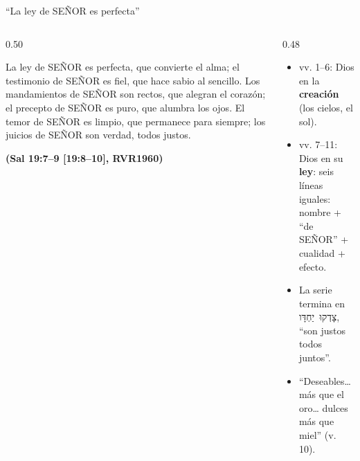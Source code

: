 \documentclass[hyperref={bookmarks=false},aspectratio=169]{beamer}
\newcommand{\heb}[1]{\mbox{\foreignlanguage{hebrew}{#1}}}
\newcommand{\SENOR}{S{\fontsize{0.78em}{1em}\selectfont EÑOR}}
\newcommand{\fuente}[1]{\par\hfill{\upshape\bfseries\footnotesize\textcolor{azul}{#1}}}
\newcommand{\destacar}[1]{\textbf{\textcolor{azul}{#1}}}
\begin{document}
\begin{frame}{``La ley de \SENOR{} es perfecta''}
\begin{columns}[c,onlytextwidth]
\begin{column}{0.50\textwidth}
\begin{cita}La ley de \SENOR{} es perfecta, que convierte el alma; el testimonio de \SENOR{} es fiel, que hace sabio al sencillo. Los mandamientos de \SENOR{} son rectos, que alegran el corazón; el precepto de \SENOR{} es puro, que alumbra los ojos. El temor de \SENOR{} es limpio, que permanece para siempre; los juicios de \SENOR{} son verdad, todos justos.\fuente{(Sal 19:7--9 [19:8--10], RVR1960)}\end{cita}
\end{column}
\begin{column}{0.48\textwidth}\small
\begin{itemize}
\item vv. 1--6: Dios en la \destacar{creación} (los cielos, el sol).
\item vv. 7--11: Dios en su \destacar{ley}: seis líneas iguales: nombre + ``de \SENOR'' + cualidad + efecto.
\item La serie termina en \heb{צָדְקוּ יַחְדָּו}, ``son justos todos juntos''.
\item ``Deseables\ldots{} más que el oro\ldots{} dulces más que miel'' (v. 10).
\end{itemize}
\end{column}
\end{columns}
\end{frame}
\end{document}
